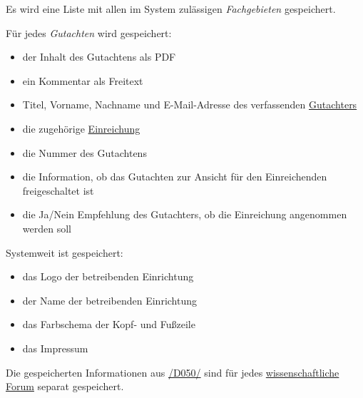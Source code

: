 \begin{description}
	 Es wird eine Liste mit allen im System zulässigen \emph{Fachgebieten} gespeichert.

	 Für jedes \emph{Gutachten} wird gespeichert:
	\begin{itemize}
		\item der Inhalt des Gutachtens als PDF
		\item ein Kommentar als Freitext
		\item Titel, Vorname, Nachname und E-Mail-Adresse des verfassenden \hyperref[funkt:Gutachter]{Gutachters}
		\item die zugehörige \hyperref[d025]{Einreichung}
		\item die Nummer des Gutachtens
		\item die Information, ob das Gutachten zur Ansicht für den Einreichenden freigeschaltet ist
		\item die Ja/Nein Empfehlung des Gutachters, ob die Einreichung angenommen werden soll
	\end{itemize}

	 Systemweit ist gespeichert:
	\begin{itemize}
		\item das Logo der betreibenden Einrichtung
		\item der Name der betreibenden Einrichtung
		\item das Farbschema der Kopf- und Fußzeile
		\item das Impressum
	\end{itemize}

	 Die gespeicherten Informationen aus \hyperref[d050]{/D050/} sind für jedes \hyperref[d030]{wissenschaftliche Forum} separat gespeichert.
\end{description}